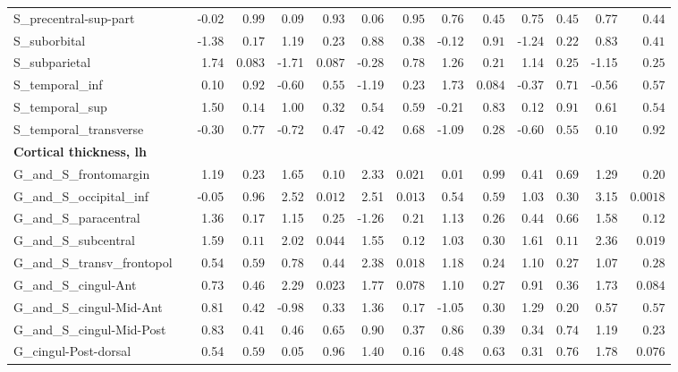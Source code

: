 {\begin{longtable}{llrrrrrrrrrrrr}
S\_precentral-sup-part &  & -0.02 & $0.99$ & 0.09 & $0.93$ & 0.06 & $0.95$ & 0.76 & $0.45$ & 0.75 & $0.45$ & 0.77 & $0.44$ \\
S\_suborbital &  & -1.38 & $0.17$ & 1.19 & $0.23$ & 0.88 & $0.38$ & -0.12 & $0.91$ & -1.24 & $0.22$ & 0.83 & $0.41$ \\
S\_subparietal &  & 1.74 & $0.083$ & -1.71 & $0.087$ & -0.28 & $0.78$ & 1.26 & $0.21$ & 1.14 & $0.25$ & -1.15 & $0.25$ \\
S\_temporal\_inf &  & 0.10 & $0.92$ & -0.60 & $0.55$ & -1.19 & $0.23$ & 1.73 & $0.084$ & -0.37 & $0.71$ & -0.56 & $0.57$ \\
S\_temporal\_sup &  & 1.50 & $0.14$ & 1.00 & $0.32$ & 0.54 & $0.59$ & -0.21 & $0.83$ & 0.12 & $0.91$ & 0.61 & $0.54$ \\
S\_temporal\_transverse &  & -0.30 & $0.77$ & -0.72 & $0.47$ & -0.42 & $0.68$ & -1.09 & $0.28$ & -0.60 & $0.55$ & 0.10 & $0.92$ \\
\midrule\multicolumn{14}{l}{\textbf{Cortical thickness, lh}} \\
G\_and\_S\_frontomargin &  & 1.19 & $0.23$ & 1.65 & $0.10$ & 2.33 & $0.021$ & 0.01 & $0.99$ & 0.41 & $0.69$ & 1.29 & $0.20$ \\
G\_and\_S\_occipital\_inf &  & -0.05 & $0.96$ & 2.52 & $0.012$ & 2.51 & $0.013$ & 0.54 & $0.59$ & 1.03 & $0.30$ & 3.15 & $0.0018$ \\
G\_and\_S\_paracentral &  & 1.36 & $0.17$ & 1.15 & $0.25$ & -1.26 & $0.21$ & 1.13 & $0.26$ & 0.44 & $0.66$ & 1.58 & $0.12$ \\
G\_and\_S\_subcentral &  & 1.59 & $0.11$ & 2.02 & $0.044$ & 1.55 & $0.12$ & 1.03 & $0.30$ & 1.61 & $0.11$ & 2.36 & $0.019$ \\
G\_and\_S\_transv\_frontopol &  & 0.54 & $0.59$ & 0.78 & $0.44$ & 2.38 & $0.018$ & 1.18 & $0.24$ & 1.10 & $0.27$ & 1.07 & $0.28$ \\
G\_and\_S\_cingul-Ant &  & 0.73 & $0.46$ & 2.29 & $0.023$ & 1.77 & $0.078$ & 1.10 & $0.27$ & 0.91 & $0.36$ & 1.73 & $0.084$ \\
G\_and\_S\_cingul-Mid-Ant &  & 0.81 & $0.42$ & -0.98 & $0.33$ & 1.36 & $0.17$ & -1.05 & $0.30$ & 1.29 & $0.20$ & 0.57 & $0.57$ \\
G\_and\_S\_cingul-Mid-Post &  & 0.83 & $0.41$ & 0.46 & $0.65$ & 0.90 & $0.37$ & 0.86 & $0.39$ & 0.34 & $0.74$ & 1.19 & $0.23$ \\
G\_cingul-Post-dorsal &  & 0.54 & $0.59$ & 0.05 & $0.96$ & 1.40 & $0.16$ & 0.48 & $0.63$ & 0.31 & $0.76$ & 1.78 & $0.076$ \\

\end{longtable}}
